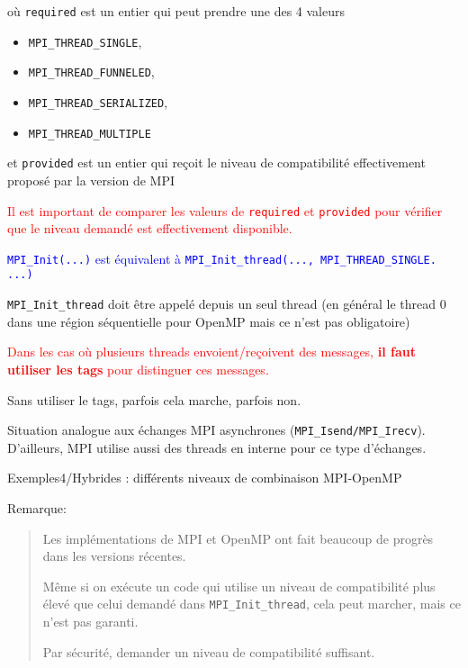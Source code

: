 \documentclass{beamer}
\begin{document}
\begin{frame}[fragile]
	où {\tt required} est un entier qui peut prendre une des 4 valeurs \begin{itemize}
		\item {\tt MPI\_THREAD\_SINGLE},
		\item {\tt MPI\_THREAD\_FUNNELED},
		\item {\tt MPI\_THREAD\_SERIALIZED},
		\item {\tt MPI\_THREAD\_MULTIPLE}
	\end{itemize}   
	\vfill
	
	et {\tt provided} est un entier qui reçoit le niveau de compatibilité effectivement proposé par la version de MPI
	
	\vfill
	\textcolor{red}{Il est important de comparer les valeurs de {\tt required} et {\tt provided} pour vérifier que le niveau demandé est effectivement disponible.} 
	
	\vfill
	\textcolor{blue}{{\tt MPI\_Init(...)} est équivalent à {\tt MPI\_Init\_thread(..., MPI\_THREAD\_SINGLE. ...)}}
	
	\vfill
	\texttt{MPI\_Init\_thread} doit être appelé depuis un seul thread (en général le thread 0 dans une région séquentielle pour OpenMP mais
	ce n'est pas obligatoire)
\end{frame}

\begin{frame}
	\vfill
	\textcolor{red}{Dans les cas où plusieurs threads envoient/reçoivent des messages, \textbf{il faut utiliser les tags} pour distinguer ces messages.}
	\bigskip
	
	Sans utiliser le tags, parfois cela marche, parfois non.
	
	\medskip
	Situation analogue aux échanges MPI asynchrones (\texttt{MPI\_Isend/MPI\_Irecv}). D'ailleurs, MPI utilise aussi des threads en interne pour ce type d'échanges.
	\vfill
\end{frame}

\begin{frame}
	Exemples4/Hybrides : différents niveaux de combinaison MPI-OpenMP
	
	\vfill
	
	Remarque:
	\begin{quote}
		Les implémentations de MPI et OpenMP ont fait beaucoup de progrès dans les versions récentes.
		
	\bigskip
		Même si on exécute un code qui utilise un niveau de compatibilité plus élevé que celui demandé dans {\tt MPI\_Init\_thread}, cela peut marcher, mais ce n'est pas garanti.
		
	\bigskip
		Par sécurité, demander un niveau de compatibilité suffisant.
	\end{quote}

	\vfill
	
\end{frame}
\end{document}
